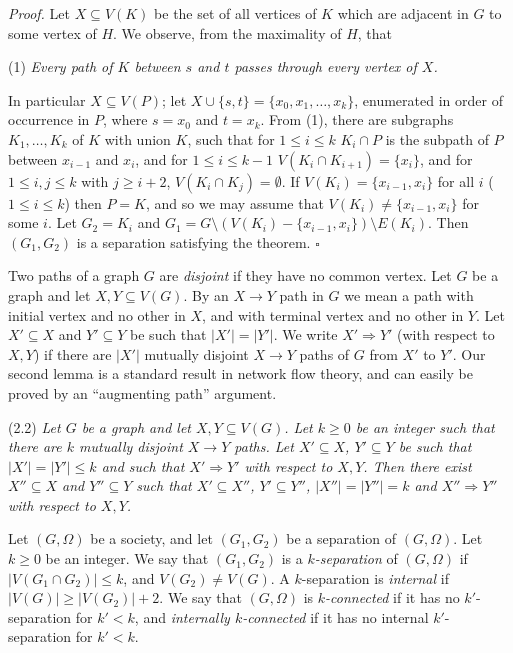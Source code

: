 \textit{Proof.} Let $X \subseteq V(K)$ be the set of all vertices of $K$ which are adjacent in $G$ to some vertex of $H$. We observe, from the maximality of $H$, that

\hspace*{12pt}(1) \textit{Every path of $K$ between $s$ and $t$ passes through every vertex of $X$.}

In particular $X \subseteq V(P)$; let $X \cup \{s, t\} = \{x_0, x_1, \dots, x_k\}$, enumerated in order of occurrence in $P$, where $s = x_0$ and $t = x_k$. From (1), there are subgraphs $K_1, \dots, K_k$ of $K$ with union $K$, such that for $1 \le i \le k$ $K_i \cap P$ is the subpath of $P$ between $x_{i-1}$ and $x_i$, and for $1 \le i \le k - 1$ $V(K_i \cap K_{i+1}) = \{x_i\}$, and for $1 \le i, j \le k$ with $j \ge i+2$, $V(K_i \cap K_j) = \emptyset$. If $V(K_i) = \{x_{i-1}, x_i\}$ for all $i$ ($1 \le i \le k$) then $P = K$, and so we may assume that $V(K_i) \ne \{x_{i-1}, x_i\}$ for some $i$. Let $G_2 = K_i$ and $G_1 = G \setminus (V(K_i) - \{x_{i-1}, x_i\}) \setminus E(K_i)$. Then $(G_1, G_2)$ is a separation satisfying the theorem. $\square$

Two paths of a graph $G$ are \textit{disjoint} if they have no common vertex. Let $G$ be a graph and let $X, Y \subseteq V(G)$. By an $X \to Y$ path in $G$ we mean a path with initial vertex and no other in $X$, and with terminal vertex and no other in $Y$. Let $X' \subseteq X$ and $Y' \subseteq Y$ be such that $|X'| = |Y'|$. We write $X' \Rightarrow Y'$ (with respect to $X, Y$) if there are $|X'|$ mutually disjoint $X \to Y$ paths of $G$ from $X'$ to $Y'$. Our second lemma is a standard result in network flow theory, and can easily be proved by an ``augmenting path'' argument.

\stmt
(2.2) \textit{Let $G$ be a graph and let $X, Y \subseteq V(G)$. Let $k \ge 0$ be an integer such that there are $k$ mutually disjoint $X \to Y$ paths. Let $X' \subseteq X$, $Y' \subseteq Y$ be such that $|X'| = |Y'| \le k$ and such that $X' \Rightarrow Y'$ with respect to $X, Y$. Then there exist $X'' \subseteq X$ and $Y'' \subseteq Y$ such that $X' \subseteq X''$, $Y' \subseteq Y''$, $|X''| = |Y''| = k$ and $X'' \Rightarrow Y''$ with respect to $X, Y$.}

Let $(G, \Omega)$ be a society, and let $(G_1, G_2)$ be a separation of $(G, \Omega)$. Let $k \ge 0$ be an integer. We say that $(G_1, G_2)$ is a \textit{$k$-separation} of $(G, \Omega)$ if $|V(G_1 \cap G_2)| \le k$, and $V(G_2) \ne V(G)$. A $k$-separation is \textit{internal} if $|V(G)| \ge |V(G_2)| + 2$. We say that $(G, \Omega)$ is \textit{$k$-connected} if it has no $k'$-separation for $k' < k$, and \textit{internally $k$-connected} if it has no internal $k'$-separation for $k' < k$.


